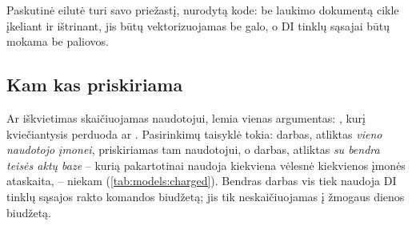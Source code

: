 Paskutinė eilutė turi savo priežastį, nurodytą kode: be laukimo dokumentą cikle įkeliant ir
ištrinant, jis būtų vektorizuojamas be galo, o DI tinklų sąsajai būtų mokama be paliovos.

\subsection{Kam kas priskiriama}

Ar iškvietimas skaičiuojamas naudotojui, lemia vienas argumentas: , kurį
kviečiantysis perduoda  ar . Pasirinkimų taisyklė tokia:
darbas, atliktas \emph{vieno naudotojo įmonei}, priskiriamas tam naudotojui, o darbas,
atliktas \emph{su bendra teisės aktų baze} -- kurią pakartotinai naudoja kiekviena vėlesnė
kiekvienos įmonės ataskaita, -- niekam (\cref{tab:models:charged}). Bendras darbas vis tiek
naudoja DI tinklų sąsajos rakto komandos biudžetą; jis tik neskaičiuojamas į žmogaus dienos
biudžetą.

